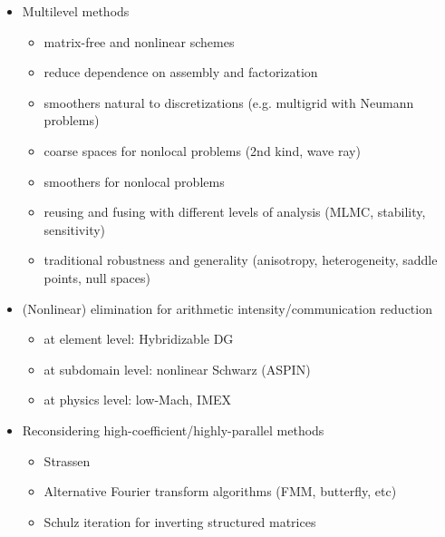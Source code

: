 \documentclass{beamer}
\begin{document}
\begin{frame}
  \begin{itemize}
  \item Multilevel methods
    \begin{itemize}
    \item matrix-free and nonlinear schemes
    \item reduce dependence on assembly and factorization
    \item smoothers natural to discretizations (e.g. multigrid with Neumann problems)
    \item coarse spaces for nonlocal problems (2nd kind, wave ray)
    \item smoothers for nonlocal problems
    \item reusing and fusing with different levels of analysis (MLMC, stability, sensitivity)
    \item traditional robustness and generality (anisotropy, heterogeneity, saddle points, null spaces)
    \end{itemize}
  \item (Nonlinear) elimination for arithmetic intensity/communication reduction
    \begin{itemize}
    \item at element level: Hybridizable DG
    \item at subdomain level: nonlinear Schwarz (ASPIN)
    \item at physics level: low-Mach, IMEX
    \end{itemize}
  \item Reconsidering high-coefficient/highly-parallel methods
    \begin{itemize}
    \item Strassen
    \item Alternative Fourier transform algorithms (FMM, butterfly, etc)
    \item Schulz iteration for inverting structured matrices
    \end{itemize}
  \end{itemize}
\end{frame}
\end{document}

